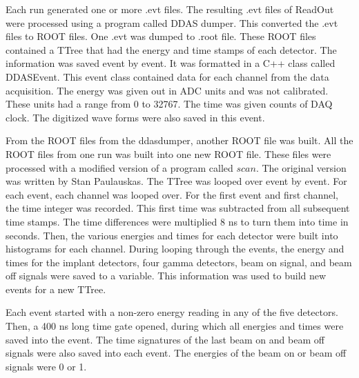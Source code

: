 \documentclass[main.tex]{subfiles}
\begin{document}
Each run generated one or more .evt files. 
The resulting .evt files of ReadOut were processed using a program called DDAS dumper.
This converted the .evt files to ROOT files.
One .evt was dumped to .root file. 
These ROOT files contained a TTree that had the energy and time stamps of each detector.
The information was saved event by event. 
It was formatted in a C++ class called DDASEvent. 
This event class contained data for each channel from the data acquisition.
The energy was given out in ADC units and was not calibrated.
These units had a range from 0 to 32767.
The time was given counts of DAQ clock.
The digitized wave forms were also saved in this event. 

From the ROOT files from the ddasdumper, another ROOT file was built.
All the ROOT files from one run was built into one new ROOT file. 
These files were processed with a modified version of a program called $scan$.
The original version was written by Stan Paulauskas.
The TTree was looped over event by event.
For each event, each channel was looped over. 
For the first event and first channel, the time integer was recorded. 
This first time was subtracted from all subsequent time stamps.
The time differences were multiplied 8 ns to turn them into time in seconds. 
Then, the various energies and times for each detector were built into histograms for each channel. 
During looping through the events, the energy and times for the implant detectors, four gamma detectors, beam on signal, and beam off signals were saved to a variable.
This information was used to build new events for a new TTree.

Each event started with a non-zero energy reading in any of the five detectors.
Then, a 400 ns long time gate opened, during which all energies and times were saved into the event.
The time signatures of the last beam on and beam off signals were also saved into each event.
The energies of the beam on or beam off signals were 0 or 1.
\end{document}
